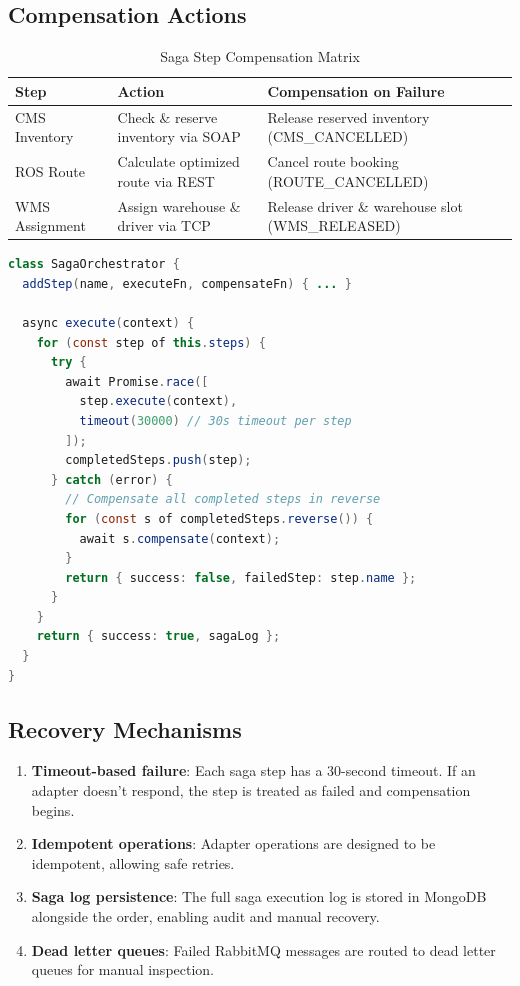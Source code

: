 \documentclass[12pt,a4paper]{article}
\begin{document}
\subsection{Compensation Actions}

\begin{table}[H]
\centering
\caption{Saga Step Compensation Matrix}
\begin{tabularx}{\textwidth}{lXX}
\toprule
\textbf{Step} & \textbf{Action} & \textbf{Compensation on Failure} \\
\midrule
CMS Inventory & Check \& reserve inventory via SOAP & Release reserved inventory (CMS\_CANCELLED) \\
ROS Route & Calculate optimized route via REST & Cancel route booking (ROUTE\_CANCELLED) \\
WMS Assignment & Assign warehouse \& driver via TCP & Release driver \& warehouse slot (WMS\_RELEASED) \\
\bottomrule
\end{tabularx}
\end{table}

\begin{lstlisting}[language=java, caption={Saga Orchestrator Implementation}]
class SagaOrchestrator {
  addStep(name, executeFn, compensateFn) { ... }

  async execute(context) {
    for (const step of this.steps) {
      try {
        await Promise.race([
          step.execute(context),
          timeout(30000) // 30s timeout per step
        ]);
        completedSteps.push(step);
      } catch (error) {
        // Compensate all completed steps in reverse
        for (const s of completedSteps.reverse()) {
          await s.compensate(context);
        }
        return { success: false, failedStep: step.name };
      }
    }
    return { success: true, sagaLog };
  }
}
\end{lstlisting}

\subsection{Recovery Mechanisms}

\begin{enumerate}
  \item \textbf{Timeout-based failure}: Each saga step has a 30-second timeout. If an adapter doesn't respond, the step is treated as failed and compensation begins.
  \item \textbf{Idempotent operations}: Adapter operations are designed to be idempotent, allowing safe retries.
  \item \textbf{Saga log persistence}: The full saga execution log is stored in MongoDB alongside the order, enabling audit and manual recovery.
  \item \textbf{Dead letter queues}: Failed RabbitMQ messages are routed to dead letter queues for manual inspection.
\end{enumerate}
\end{document}
